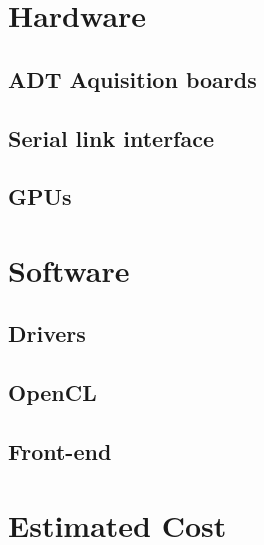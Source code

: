 \section{Hardware}

	\subsection{ADT Aquisition boards}

	\subsection{Serial link interface}

	\subsection{GPUs}

\section{Software}

	\subsection{Drivers}

	\subsection{OpenCL}

	\subsection{Front-end}

\section{Estimated Cost}